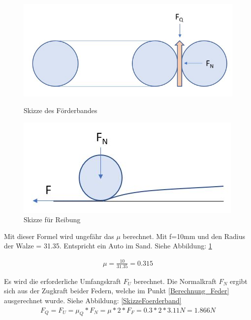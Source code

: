 \begin{figure}[H]
   \begin{minipage}[hbt]{.4\linewidth} %
      \includegraphics[width=\linewidth]{Bilder/Powerpoint/Foerderband_Skizze}
      \caption{Skizze des Förderbandes}
      \label{SkizzeFoerderband} 
   \end{minipage}
   \hspace{.2\linewidth}%
   \begin{minipage}[hbt]{.4\linewidth} %
      \includegraphics[width=\linewidth]{Bilder/Powerpoint/Reibung}
      \caption{Skizze für Reibung}
      \label{SkizzeReibung}
   \end{minipage}
\end{figure}

Mit dieser Formel wird ungefähr das $\mu$ berechnet. Mit f=10mm und den Radius der Walze = 31.35. Entspricht ein Auto im Sand. Siehe Abbildung: \ref{SkizzeReibung}

\begin{align*}
\mu = \frac{10}{31.35} = 0.315
\end{align*}

Es wird die erforderliche Umfangskraft $F_U$ berechnet. Die Normalkraft $F_N$ ergibt sich aus der Zugkraft beider Federn, welche im Punkt \ref{Berechnung_Feder} ausgerechnet wurde. Siehe Abbildung: \ref{SkizzeFoerderband}
\begin{align*}
F_Q= F_U=\mu_Q*F_N = \mu*2*F_{F} = 0.3*2*3.11N = 1.866N
\end{align*}

